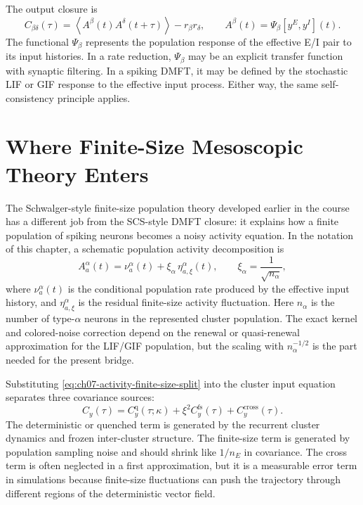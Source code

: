 The output closure is
\[
        C_{\beta\delta}(\tau)
        =
        \left\langle
        A^\beta(t)A^\delta(t+\tau)
        \right\rangle
        -
        r_\beta r_\delta,
        \qquad
        A^\beta(t)=\Psi_\beta[y^E,y^I](t).
        \label{eq:ch07-ei-output-closure}
\]
The functional \(\Psi_\beta\) represents the population response of the
effective E/I pair to its input histories. In a rate reduction, \(\Psi_\beta\)
may be an explicit transfer function with synaptic filtering. In a spiking
DMFT, it may be defined by the stochastic LIF or GIF response to the effective
input process. Either way, the same self-consistency principle applies.

\section{Where Finite-Size Mesoscopic Theory Enters}
\label{sec:ch07-finite-size-mesoscopic-bridge}

The Schwalger-style finite-size population theory developed earlier in the
course has a different job from the SCS-style DMFT closure: it explains how a
finite population of spiking neurons becomes a noisy activity equation. In the
notation of this chapter, a schematic population activity decomposition is
\[
        A_a^\alpha(t)
        =
        \nu_a^\alpha(t)
        +
        \xi_\alpha\,\eta_{a,\xi}^\alpha(t),
        \qquad
        \xi_\alpha=\frac{1}{\sqrt{n_\alpha}},
        \label{eq:ch07-activity-finite-size-split}
\]
where \(\nu_a^\alpha(t)\) is the conditional population rate produced by the
effective input history, and \(\eta_{a,\xi}^\alpha\) is the residual finite-size
activity fluctuation. Here \(n_\alpha\) is the number of type-\(\alpha\)
neurons in the represented cluster population. The exact kernel and
colored-noise correction depend on the renewal or quasi-renewal approximation
for the LIF/GIF population, but the scaling with \(n_\alpha^{-1/2}\) is the part
needed for the present bridge.

Substituting \cref{eq:ch07-activity-finite-size-split} into the cluster input
equation separates three covariance sources:
\[
        C_y(\tau)
        =
        C_y^{\mathrm{q}}(\tau;\kappa)
        +
        \xi^2 C_y^{\mathrm{fs}}(\tau)
        +
        C_y^{\mathrm{cross}}(\tau).
        \label{eq:ch07-input-covariance-split}
\]
The deterministic or quenched term is generated by the recurrent cluster
dynamics and frozen inter-cluster structure. The finite-size term is generated
by population sampling noise and should shrink like \(1/n_E\) in covariance.
The cross term is often neglected in a first approximation, but it is a
measurable error term in simulations because finite-size fluctuations can push
the trajectory through different regions of the deterministic vector field.

